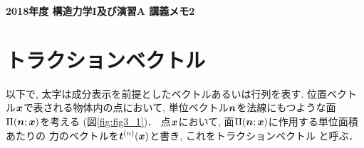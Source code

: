 \documentclass[10pt,a4j]{jarticle}
\newlength{\minitwocolumn}
\begin{document}
\newcommand{\fat}[1]{\mbox{\boldmath $#1$}}
\newcommand{\D}{\partial}
\newcommand{\w}{\omega}
\newcommand{\ga}{\alpha}
\newcommand{\gb}{\beta}
\newcommand{\gx}{\xi}
\newcommand{\gz}{\zeta}
\newcommand{\vhat}[1]{\hat{\fat{#1}}}
\newcommand{\spc}{\vspace{0.7\baselineskip}}
\newcommand{\halfspc}{\vspace{0.3\baselineskip}}

\newcommand{\twofig}[2]
 {
   \begin{figure}
     \begin{minipage}[t]{\minitwocolumn}
         \begin{center}   #1
         \end{center}
     \end{minipage}
         \hspace{\columnsep}
     \begin{minipage}[t]{\minitwocolumn}
         \begin{center} #2
         \end{center}
     \end{minipage}
   \end{figure}
 }
\begin{center}
	{\Large \bf 2018年度 構造力学I及び演習A 講義メモ2} \\
\end{center}
\section{トラクションベクトル}
以下で, 太字は成分表示を前提としたベクトルあるいは行列を表す.
位置ベクトル$\fat{x}$で表される物体内の点において, 
単位ベクトル$\fat{n}$を法線にもつような面$\Pi(\fat{n};\fat{x})$を考える
(図\ref{fig:fig3_1})．
点$\fat{x}$において, 面$\Pi(\fat{n};\fat{x})$に作用する単位面積あたりの
力のベクトルを$\fat{t}^{(n)}(\fat{x})$と書き, これをトラクションベクトル
と呼ぶ．
\end{document}

